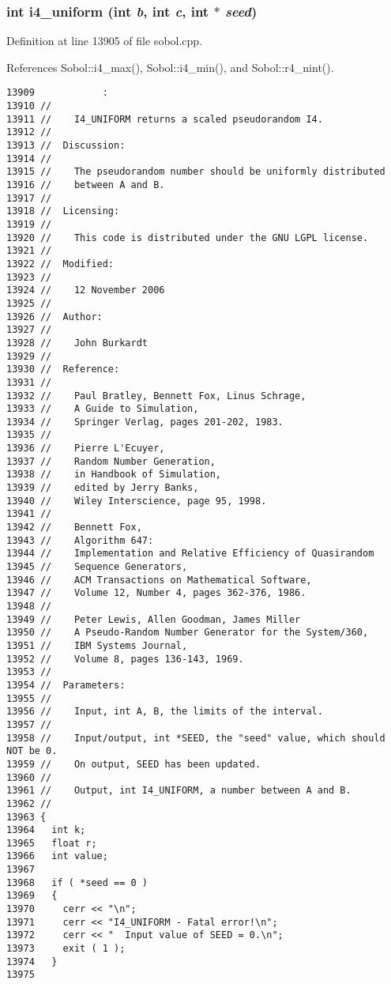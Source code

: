 \subsubsection{\setlength{\rightskip}{0pt plus 5cm}int i4\_\-uniform (int {\em b}, int {\em c}, int $\ast$ {\em seed})}\label{test_2sobol_8H_102057147e64a1a2cc4a9d1d535d820e}




Definition at line 13905 of file sobol.cpp.

References Sobol::i4\_\-max(), Sobol::i4\_\-min(), and Sobol::r4\_\-nint().

\begin{Code}\begin{verbatim}13909            :
13910 //
13911 //    I4_UNIFORM returns a scaled pseudorandom I4.
13912 //
13913 //  Discussion:
13914 //
13915 //    The pseudorandom number should be uniformly distributed
13916 //    between A and B.
13917 //
13918 //  Licensing:
13919 //
13920 //    This code is distributed under the GNU LGPL license. 
13921 //
13922 //  Modified:
13923 //
13924 //    12 November 2006
13925 //
13926 //  Author:
13927 //
13928 //    John Burkardt
13929 //
13930 //  Reference:
13931 //
13932 //    Paul Bratley, Bennett Fox, Linus Schrage,
13933 //    A Guide to Simulation,
13934 //    Springer Verlag, pages 201-202, 1983.
13935 //
13936 //    Pierre L'Ecuyer,
13937 //    Random Number Generation,
13938 //    in Handbook of Simulation,
13939 //    edited by Jerry Banks,
13940 //    Wiley Interscience, page 95, 1998.
13941 //
13942 //    Bennett Fox,
13943 //    Algorithm 647:
13944 //    Implementation and Relative Efficiency of Quasirandom
13945 //    Sequence Generators,
13946 //    ACM Transactions on Mathematical Software,
13947 //    Volume 12, Number 4, pages 362-376, 1986.
13948 //
13949 //    Peter Lewis, Allen Goodman, James Miller
13950 //    A Pseudo-Random Number Generator for the System/360,
13951 //    IBM Systems Journal,
13952 //    Volume 8, pages 136-143, 1969.
13953 //
13954 //  Parameters:
13955 //
13956 //    Input, int A, B, the limits of the interval.
13957 //
13958 //    Input/output, int *SEED, the "seed" value, which should NOT be 0.
13959 //    On output, SEED has been updated.
13960 //
13961 //    Output, int I4_UNIFORM, a number between A and B.
13962 //
13963 {
13964   int k;
13965   float r;
13966   int value;
13967 
13968   if ( *seed == 0 )
13969   {
13970     cerr << "\n";
13971     cerr << "I4_UNIFORM - Fatal error!\n";
13972     cerr << "  Input value of SEED = 0.\n";
13973     exit ( 1 );
13974   }
13975 

\end{verbatim}
\end{Code}
